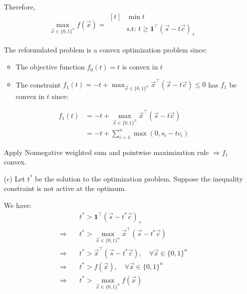 \begin{solution}
\begin{itemize}
              Therefore,
              \begin{equation*}
                  \max_{\vec{x} \in \{0,1\}^n} f(\vec{x}) =
                  \begin{aligned}[t]
                       & \min t                                                   \\
                       & \text{s.t: } t \ge \mathbf{1}^\top(\vec{s} - t\vec{c})_+
                  \end{aligned}
              \end{equation*}

              The reformulated problem is a convex optimization problem since:
              \begin{itemize}
                  \item The objective function $f_0(t) = t$ is convex in $t$
                  \item The constraint $f_1(t) = -t + \max_{\vec{x} \in \{0,1\}^n}
                            \vec{x}^\top(\vec{s} - t\vec{c}) \le 0$ has $f_1$ be convex in $t$ since:
              \end{itemize}
              \begin{align*}
                  f_1(t) & = -t + \max_{\vec{x} \in \{0,1\}^n} \vec{x}^\top(\vec{s} - t\vec{c}) \\
                         & = -t + \sum_{i=1}^n \max(0, s_i - tc_i)
              \end{align*}

              Apply Nonnegative weighted sum and pointwise maximization rule
              $\Rightarrow f_1$ convex.

        \item[(c)] Let $t^*$ be the solution to the optimization problem.
              Suppose the inequality constraint is not active at the optimum.

              We have:
              \begin{align*}
                                    & t^* > \mathbf{1}^\top(\vec{s} - t^*\vec{c})_+ \\
                  \Rightarrow \quad & t^* > \max_{\vec{x} \in \{0,1\}^n}
                  \vec{x}^\top(\vec{s} - t^*\vec{c})                                \\
                  \Rightarrow \quad & t^* > \vec{x}^\top(\vec{s} - t^*\vec{c}),
                  \quad \forall \vec{x} \in \{0,1\}^n                               \\
                  \Rightarrow \quad & t^* > f(\vec{x}),
                  \quad \forall \vec{x} \in \{0,1\}^n                               \\
                  \Rightarrow \quad & t^* > \max_{\vec{x} \in \{0,1\}^n} f(\vec{x})
              \end{align*}


\end{itemize}
\end{solution}
